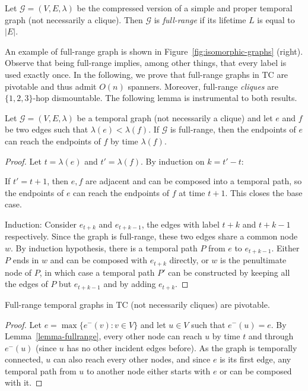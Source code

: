 \documentclass[USenglish, a4paper, thm-restate,numberwithinsect, cleveref]{lipics-v2021}
\newcommand{\G}{\ensuremath{\mathcal{G}}\xspace}
\begin{document}
\begin{definition}
  Let $\G=(V,E,\lambda)$ be the compressed version of a simple and proper temporal graph (not necessarily a clique). Then $\G$ is \emph{full-range} if its lifetime $L$ is equal to $|E|$.
\end{definition}

An example of full-range graph is shown in Figure~\ref{fig:isomorphic-graphs} (right). Observe that being full-range implies, among other things, that every label is used exactly once.
In the following, we prove that full-range graphs in \textsf{TC} are pivotable and thus admit $O(n)$ spanners. Moreover, full-range \emph{cliques} are $\{1,2,3\}$-hop dismountable. The following lemma is instrumental to both results.

\begin{lemma}\label{lemma-fullrange}
  Let $\G=(V,E,\lambda)$ be a temporal graph (not necessarily a clique) and let $e$ and $f$ be two edges such that $\lambda(e) < \lambda(f)$. If $\G$ is full-range, then the endpoints of $e$ can reach the endpoints of $f$ by time $\lambda(f)$.
\end{lemma}

\begin{proof}Let $t=\lambda(e)$ and $t'=\lambda(f)$.
  By induction on $k=t'-t$:

  If $t' = t+1$, then $e,f$ are adjacent and can be composed into a temporal path, so the endpoints of $e$ can reach the endpoints of $f$ at time $t+1$. This closes the base case.

  Induction: Consider $e_{t+k}$ and $e_{t+k-1}$, the edges with label $t+k$ and $t+k-1$ respectively.
  Since the graph is full-range, these two edges share a common node $w$.  By induction hypothesis, there is a temporal path $P$ from $e$ to $e_{t+k-1}$.
  Either $P$ ends in $w$ and can be composed with $e_{t+k}$ directly, or $w$ is the penultimate node of $P$,
  in which case a temporal path $P'$ can be constructed by keeping all the edges of $P$ but $e_{t+k-1}$ and by adding $e_{t+k}$.
\end{proof}

\begin{theorem}
  \label{full-range-pivotable}
  Full-range temporal graphs in \textsf{TC} (not necessarily cliques) are pivotable. %
\end{theorem}
\begin{proof}
  Let $e=\max\{e^-(v):v\in V\}$ and let $u\in V$ such that $e^-(u)=e$.
  By Lemma~\ref{lemma-fullrange}, every other node can reach $u$ by time $t$ and through $e^-(u)$ (since $u$ has no other incident edges before).
  As the graph is temporally connected, $u$ can also reach every other nodes, and since $e$ is its first edge, any temporal path from $u$ to another node either starts with $e$ or can be composed with it.
\end{proof}
\end{document}
